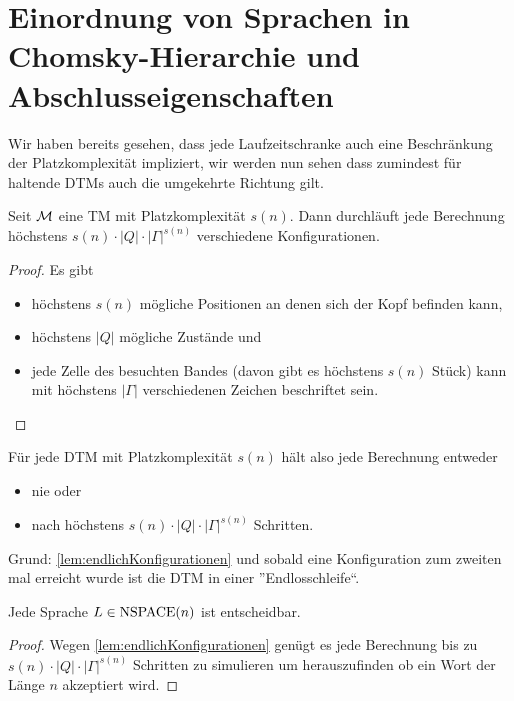 









\newpage

\section{Einordnung von Sprachen in Chomsky-Hierarchie und Abschlusseigenschaften}

Wir haben bereits gesehen, dass jede Laufzeitschranke auch eine Beschränkung der Platzkomplexität impliziert,
wir werden nun sehen dass zumindest für haltende DTMs auch die umgekehrte Richtung gilt.
\begin{lemma}\label{lem:endlichKonfigurationen}
 Seit $\mathcal{M}$ eine \ac{TM} mit Platzkomplexität $s(n)$.
 Dann durchläuft jede Berechnung höchstens $s(n)\cdot |Q| \cdot |\Gamma|^{s(n)}$
 verschiedene Konfigurationen.
\end{lemma}
\begin{proof}
 Es gibt 
 \begin{itemize}
  \item höchstens $s(n)$ mögliche Positionen an denen sich der Kopf befinden kann,
  \item höchstens $|Q|$ mögliche Zustände und
  \item jede Zelle des besuchten Bandes (davon gibt es höchstens $s(n)$ Stück) kann mit höchstens $|\Gamma|$ verschiedenen Zeichen beschriftet sein. \qedhere
 \end{itemize}
\end{proof}

\begin{Bemerkung}
 Für jede DTM mit Platzkomplexität $s(n)$ hält also jede Berechnung entweder
 \begin{itemize}
  \item nie oder
  \item nach höchstens $s(n)\cdot |Q| \cdot |\Gamma|^{s(n)}$ Schritten.
 \end{itemize}
Grund: \autoref{lem:endlichKonfigurationen} und sobald eine Konfiguration zum zweiten mal erreicht wurde ist die DTM in einer ''Endlosschleife``.
\end{Bemerkung}


\begin{Satz}
 Jede Sprache $L\in\operatorname{NSPACE}(n)$ ist entscheidbar.
\end{Satz}
\begin{proof}
 Wegen \autoref{lem:endlichKonfigurationen} genügt es jede Berechnung bis zu 
 $s(n)\cdot |Q| \cdot |\Gamma|^{s(n)}$
 Schritten zu simulieren um herauszufinden ob ein Wort der Länge $n$ akzeptiert wird.
\end{proof}


